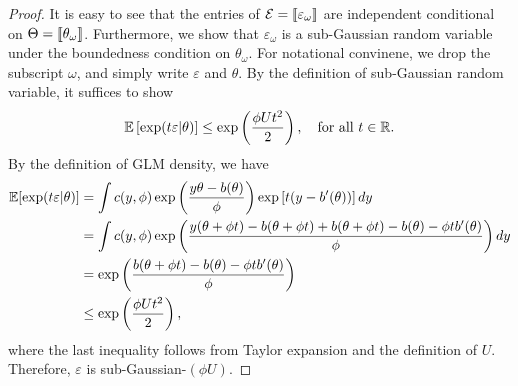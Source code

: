 \documentclass[11pt]{article}
\theoremstyle{plain}
\theoremstyle{definition}
\begin{document}
\begin{proof} It is easy to see that the entries of $\mathcal{E}=\llbracket \varepsilon_\omega \rrbracket$ are independent conditional on $\Theta=\llbracket \theta_\omega \rrbracket$. Furthermore, we show that $\varepsilon_\omega$ is a sub-Gaussian random variable under the boundedness condition on $\theta_\omega$. For notational convinene, we drop the subscript $\omega$, and simply write $\varepsilon$ and $\theta$. By the definition of sub-Gaussian random variable, it suffices to show 
\[
\mathbb{E}\left[\exp(t\varepsilon|\theta)\right]\leq \exp\left(\phi U t^2\over 2 \right), \quad \text{for all }t\in\mathbb{R}.
\]
By the definition of GLM density, we have
\begin{align}
\mathbb{E}[\exp(t\varepsilon|\theta)]&=\int c(y,\phi) \exp\left({y\theta  - b(\theta)\over \phi}   \right)\exp \left[t(y-b'(\theta))\right]dy\\
&=\int c(y,\phi)\exp \left( {y(\theta + \phi t) - b (\theta+\phi t)+b(\theta+\phi t)-b(\theta)-\phi t b'(\theta) \over \phi}\right)dy\\
&=\exp\left( {b(\theta+\phi t)-b(\theta)-\phi t b'(\theta) \over \phi} \right)\\
&\leq \exp\left(\phi U t^2\over 2 \right),
\end{align}
where the last inequality follows from Taylor expansion and the definition of $U$. Therefore, $\varepsilon$ is sub-Gaussian-$(\phi U)$. 
\end{proof}




\end{document}
